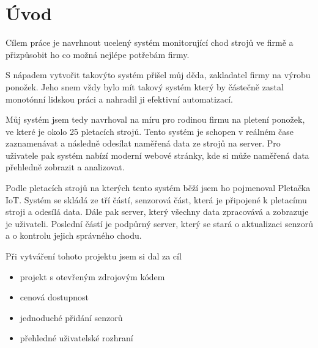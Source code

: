\chapter*{Úvod}


Cílem práce je navrhnout ucelený systém monitorující chod strojů ve firmě a přizpůsobit ho co možná nejlépe potřebám firmy.

S nápadem vytvořit takovýto systém přišel můj děda, zakladatel firmy na výrobu ponožek.
Jeho snem vždy bylo mít takový systém který by částečně zastal monotónní lidskou práci a nahradil ji efektivní automatizací.

Můj systém jsem tedy navrhoval na míru pro rodinou firmu na pletení ponožek, ve které je okolo 25 pletacích strojů. 
Tento systém je schopen v reálném čase zaznamenávat a následně odesílat naměřená data ze strojů na server. 
Pro uživatele pak systém nabízí moderní webové stránky, kde si může naměřená data přehledně zobrazit a analizovat.

Podle pletacích strojů na kterých tento systém běží jsem ho pojmenoval Pletačka IoT. 
Systém se skládá ze tří částí, senzorová část, která je připojené k pletacímu stroji a odesílá data.
Dále pak server, který všechny data zpracovává a zobrazuje je uživateli.
Poslední částí je podpůrný server, který se stará o aktualizaci senzorů a o kontrolu jejich správného chodu.\newline



Při vytváření tohoto projektu jsem si dal za cíl
\begin{itemize}
    \item projekt s otevřeným zdrojovým kódem
    \item cenová dostupnost
    \item jednoduché přidání senzorů
    \item přehledné uživatelské rozhraní
\end{itemize}

\newpage
